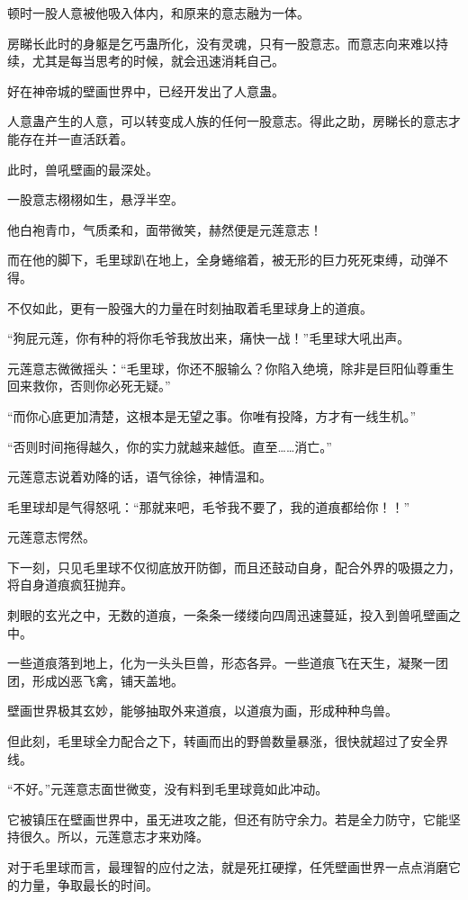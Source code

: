 \begin{this_body}
顿时一股人意被他吸入体内，和原来的意志融为一体。

房睇长此时的身躯是乞丐蛊所化，没有灵魂，只有一股意志。而意志向来难以持续，尤其是每当思考的时候，就会迅速消耗自己。

好在神帝城的壁画世界中，已经开发出了人意蛊。

人意蛊产生的人意，可以转变成人族的任何一股意志。得此之助，房睇长的意志才能存在并一直活跃着。

此时，兽吼壁画的最深处。

一股意志栩栩如生，悬浮半空。

他白袍青巾，气质柔和，面带微笑，赫然便是元莲意志！

而在他的脚下，毛里球趴在地上，全身蜷缩着，被无形的巨力死死束缚，动弹不得。

不仅如此，更有一股强大的力量在时刻抽取着毛里球身上的道痕。

“狗屁元莲，你有种的将你毛爷我放出来，痛快一战！”毛里球大吼出声。

元莲意志微微摇头：“毛里球，你还不服输么？你陷入绝境，除非是巨阳仙尊重生回来救你，否则你必死无疑。”

“而你心底更加清楚，这根本是无望之事。你唯有投降，方才有一线生机。”

“否则时间拖得越久，你的实力就越来越低。直至……消亡。”

元莲意志说着劝降的话，语气徐徐，神情温和。

毛里球却是气得怒吼：“那就来吧，毛爷我不要了，我的道痕都给你！！”

元莲意志愕然。

下一刻，只见毛里球不仅彻底放开防御，而且还鼓动自身，配合外界的吸摄之力，将自身道痕疯狂抛弃。

刺眼的玄光之中，无数的道痕，一条条一缕缕向四周迅速蔓延，投入到兽吼壁画之中。

一些道痕落到地上，化为一头头巨兽，形态各异。一些道痕飞在天生，凝聚一团团，形成凶恶飞禽，铺天盖地。

壁画世界极其玄妙，能够抽取外来道痕，以道痕为画，形成种种鸟兽。

但此刻，毛里球全力配合之下，转画而出的野兽数量暴涨，很快就超过了安全界线。

“不好。”元莲意志面世微变，没有料到毛里球竟如此冲动。

它被镇压在壁画世界中，虽无进攻之能，但还有防守余力。若是全力防守，它能坚持很久。所以，元莲意志才来劝降。

对于毛里球而言，最理智的应付之法，就是死扛硬撑，任凭壁画世界一点点消磨它的力量，争取最长的时间。


\end{this_body}
